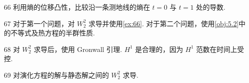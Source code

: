 \begin{sourcehint}{66}
利用熵的位移凸性，比较沿一条测地线的熵在 $t=0$ 与 $t=1$ 处的导数.
\end{sourcehint}
\begin{sourcehint}{67}
对于第一个问题，对 $W_2^2$ 求导并使用\autoref{ex:66}. 对于第二个问题，使用\autoref{obj:5.2}中的不等式及热方程的半群性质.
\end{sourcehint}
\begin{sourcehint}{68}
对 $W_2^2$ 求导后，使用 Gronwall 引理. $H^1$ 是合理的，因为 $H^1$ 范数在时间上受控.
\end{sourcehint}
\begin{sourcehint}{69}
对演化方程的解与静态解之间的 $W_2^2$ 求导.
\end{sourcehint}
